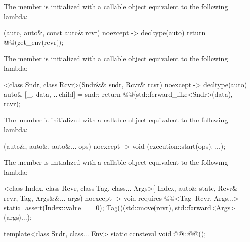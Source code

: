 \pnum
The member 
is initialized with a callable object equivalent to the following lambda:
\begin{codeblock}
[](auto, auto&, const auto& rcvr) noexcept -> decltype(auto) {
  return @@(get_env(rcvr));
}
\end{codeblock}

\pnum
The member 
is initialized with a callable object equivalent to the following lambda:
\begin{codeblock}
[]<class Sndr, class Rcvr>(Sndr&& sndr, Rcvr& rcvr) noexcept -> decltype(auto) {
  auto& [_, data, ...child] = sndr;
  return @@(std::forward_like<Sndr>(data), rcvr);
}
\end{codeblock}

\pnum
The member 
is initialized with a callable object equivalent to the following lambda:
\begin{codeblock}
[](auto&, auto&, auto&... ops) noexcept -> void {
  (execution::start(ops), ...);
}
\end{codeblock}

\pnum
The member 
is initialized with a callable object equivalent to the following lambda:
\begin{codeblock}
[]<class Index, class Rcvr, class Tag, class... Args>(
  Index, auto& state, Rcvr& rcvr, Tag, Args&&... args) noexcept
    -> void requires @@<Tag, Rcvr, Args...> {
  static_assert(Index::value == 0);
  Tag()(std::move(rcvr), std::forward<Args>(args)...);
}
\end{codeblock}

%
\begin{itemdecl}
template<class Sndr, class... Env>
  static consteval void @@::@@();
\end{itemdecl}

